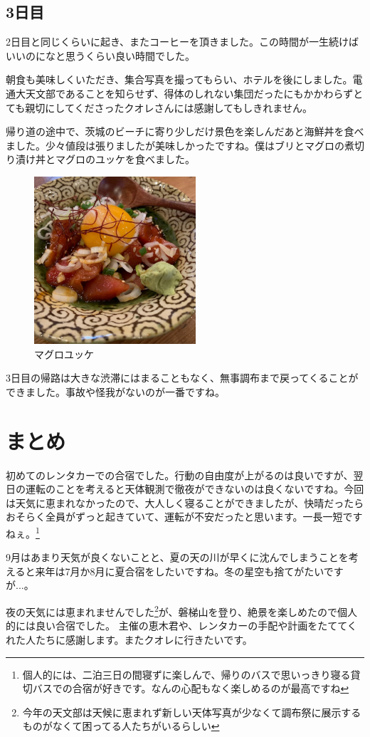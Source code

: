 \documentclass[../main]{subfiles}
\begin{document}
\subsection{3日目}
2日目と同じくらいに起き、またコーヒーを頂きました。この時間が一生続けばいいのになと思うくらい良い時間でした。

朝食も美味しくいただき、集合写真を撮ってもらい、ホテルを後にしました。電通大天文部であることを知らせず、得体のしれない集団だったにもかかわらずとても親切にしてくださったクオレさんには感謝してもしきれません。

帰り道の途中で、茨城のビーチに寄り少しだけ景色を楽しんだあと海鮮丼を食べました。少々値段は張りましたが美味しかったですね。僕はブリとマグロの煮切り漬け丼とマグロのユッケを食べました。
\begin{figure}[H]
\centering
\includegraphics[width=6cm]{sections/Nakahara/yukke.jpeg}
\caption{マグロユッケ}
\centering
\end{figure}
3日目の帰路は大きな渋滞にはまることもなく、無事調布まで戻ってくることができました。事故や怪我がないのが一番ですね。

\section{まとめ}
初めてのレンタカーでの合宿でした。行動の自由度が上がるのは良いですが、翌日の運転のことを考えると天体観測で徹夜ができないのは良くないですね。今回は天気に恵まれなかったので、大人しく寝ることができましたが、快晴だったらおそらく全員がずっと起きていて、運転が不安だったと思います。一長一短ですねぇ。\footnote{個人的には、二泊三日の間寝ずに楽しんで、帰りのバスで思いっきり寝る貸切バスでの合宿が好きです。なんの心配もなく楽しめるのが最高ですね}

9月はあまり天気が良くないことと、夏の天の川が早くに沈んでしまうことを考えると来年は7月か8月に夏合宿をしたいですね。冬の星空も捨てがたいですが...。

夜の天気には恵まれませんでした\footnote{今年の天文部は天候に恵まれず新しい天体写真が少なくて調布祭に展示するものがなくて困ってる人たちがいるらしい}が、磐梯山を登り、絶景を楽しめたので個人的には良い合宿でした。
主催の恵木君や、レンタカーの手配や計画をたててくれた人たちに感謝します。またクオレに行きたいです。
\end{document}
